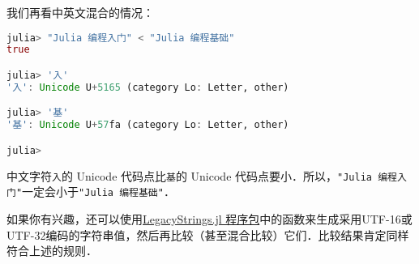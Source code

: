 我们再看中英文混合的情况：
\begin{lstlisting}[language=julia]
julia> "Julia 编程入门" < "Julia 编程基础"
true

julia> '入'
'入': Unicode U+5165 (category Lo: Letter, other)

julia> '基'
'基': Unicode U+57fa (category Lo: Letter, other)

julia> 
\end{lstlisting}

中文字符\verb|入|的 Unicode 代码点比\verb|基|的 Unicode 代码点要小．所以，\verb|"Julia 编程入门"|一定会小于\verb|"Julia 编程基础"|．

如果你有兴趣，还可以使用\href{https://github.com/JuliaStrings/LegacyStrings.jl}{LegacyStrings.jl 程序包}中的函数来生成采用UTF-16或UTF-32编码的字符串值，然后再比较（甚至混合比较）它们．比较结果肯定同样符合上述的规则．
